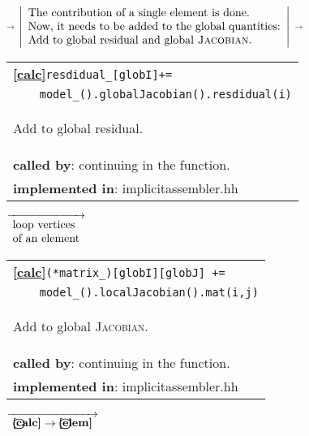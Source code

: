 \begin{landscape}
{\begin{tabular}{|l|}
	\hline 
  \end{tabular}
  {\scriptsize$\overrightarrow{}$ }
  $\left|
     \begin{array}{l}
    \textnormal{The contribution of a single element is done.}\\
    \textnormal{Now, it needs to be added to the global quantities:}\\
    \textnormal{Add to global residual and global \textsc{Jacobian}.}
  \end{array}
  \right |$
    {\scriptsize$\overrightarrow{}$ }
   \begin{tabular}{|l|} 
      \hline 
      \textbf{\textcircled{\ref{calc}}}\verb?resdidual_[globI]+=? \\ 
		  \verb?    model_().globalJacobian().resdidual(i)? \\ 
      \begin{scriptsize}Add to global residual.\end{scriptsize}\\
      \textbf{called by}: continuing in the function. \\ 
      \textbf{implemented in}: implicitassembler.hh\\ 
	\hline 
  \end{tabular}
 \nextline
   {\scriptsize$\overrightarrow{ 
    \begin{array}{l} 
    \textnormal{loop vertices}\\
    \textnormal{of an element}
    \end{array}}$}
   \begin{tabular}{|l|} 
      \hline 
      \textbf{\textcircled{\ref{calc}}}\verb?(*matrix_)[globI][globJ] +=? \\ 
		\verb?    model_().localJacobian().mat(i,j)? \\ 
      \begin{scriptsize}Add to global \textsc{Jacobian}.\end{scriptsize}\\
      \textbf{called by}: continuing in the function. \\ 
      \textbf{implemented in}: implicitassembler.hh\\ 
	\hline 
  \end{tabular}
    {\scriptsize$\overrightarrow{
	  \begin{array}{l}
	   \textbf{\textcircled{\ref{calc}}}\rightarrow\textbf{\textcircled{\ref{elem}}}\\
           \end{array}
    }$}
   \begin{tabular}{|l|} 

\end{tabular}}
\end{landscape}
